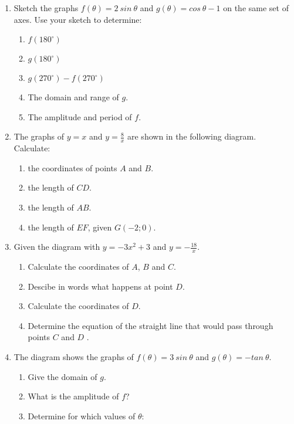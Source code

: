 \begin{eocexercises}{}
\begin{enumerate}[itemsep=9pt, label=\textbf{\arabic*}. ]
  \item Sketch the graphs $f(\theta)=2~ sin~\theta$ and $g(\theta)=cos~\theta-1$ on the same set of axes. Use your sketch to determine:
    \begin{enumerate}[noitemsep, label=\textbf{(\alph*)} ]
    \item $f(180^{\circ})$
    \item $g(180^{\circ})$
    \item $g(270^{\circ}) -f(270^{\circ})$
    \item The domain and range of $g$.
    \item The amplitude and period of $f$.
    \end{enumerate}
\item The graphs of $y=x$ and $y=\frac{8}{x}$ are shown in the following diagram.\\
    Calculate:
    \begin{enumerate}[noitemsep, label=\textbf{(\alph*)} ]
    \item the coordinates of points $A$ and $B$.
    \item the length of $CD$.
    \item the length of $AB$.
    \item the length of $EF$, given $G(-2;0)$.
  \end{enumerate}
\item Given the diagram with $y=-3x^2+3$ and $y=-\frac{18}{x}$.\\
    \begin{enumerate}[noitemsep, label=\textbf{(\alph*)} ]
    \item Calculate the coordinates of $A$, $B$ and $C$.
    \item Descibe in words what happens at point $D$.
    \item Calculate the coordinates of $D$.
    \item Determine the equation of the straight line that would pass through points $C$ and $D$ .
  \end{enumerate}
\item The diagram shows the graphs of $f(\theta)=3~sin~\theta$ and $g(\theta)=-tan~\theta$.
    \begin{enumerate}[noitemsep, label=\textbf{(\alph*)} ]
    \item Give the domain of $g$.
    \item What is the amplitude of $f$?
    \item Determine for which values of $\theta$:

\end{enumerate}
\end{enumerate}
\end{eocexercises}
